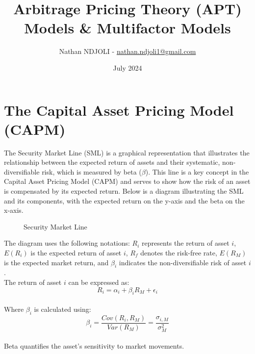 \documentclass[a4paper,10pt]{article}
\title{Arbitrage Pricing Theory (APT) Models \& Multifactor Models}
\author{Nathan NDJOLI - \href{mailto:nathan.ndjoli1@gmail.com}{nathan.ndjoli1@gmail.com}}
\date{July 2024}
\begin{document}
\maketitle

\section*{The Capital Asset Pricing Model (CAPM)}

\noindent The Security Market Line (SML) is a graphical representation that illustrates the relationship between the expected return of assets and their systematic, non-diversifiable risk, which is measured by beta (\(\beta\)). This line is a key concept in the Capital Asset Pricing Model (CAPM) and serves to show how the risk of an asset is compensated by its expected return. Below is a diagram illustrating the SML and its components, with the expected return on the y-axis and the beta on the x-axis. \\

\begin{figure}[ht]
\centering
{}
\caption{Security Market Line }
\end{figure}

\noindent The diagram uses the following notations: \( R_i \) represents the return of asset \( i \), \( E(R_i) \) is the expected return of asset \( i \), \( R_f \) denotes the risk-free rate, \( E(R_M) \) is the expected market return, and \( \beta_i \) indicates the non-diversifiable risk of asset \( i \). \\

\noindent The return of asset \( i \) can be expressed as: \\
\[ R_i = \alpha_i + \beta_i R_M + \epsilon_i \] \\
\noindent Where \( \beta_i \) is calculated using: \\
\[ \beta_i = \frac{Cov(R_i, R_M)}{Var(R_M)} = \frac{\sigma_{i,M}}{\sigma_M^2} \] \\
\noindent Beta quantifies the asset's sensitivity to market movements. \\
\end{document}
